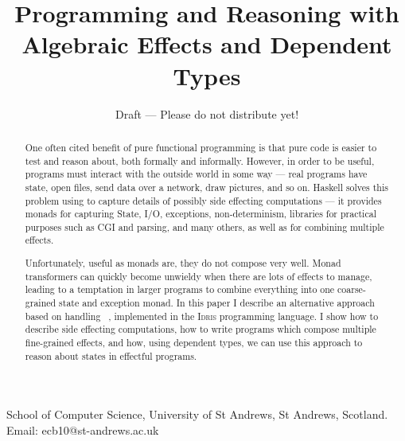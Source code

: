 \documentclass[preprint]{sigplanconf}
\newcounter{per}
\newcommand{\Idris}{\textsc{Idris}}
\begin{document}
\title{Programming and Reasoning with Algebraic Effects and Dependent Types}
\subtitle{Draft --- Please do not distribute yet!}
{School of Computer Science, 
University of St Andrews, St Andrews, Scotland.}
{Email: ecb10@st-andrews.ac.uk}

\maketitle

\begin{abstract}
One often cited benefit of pure functional programming is that pure code is
easier to test and reason about, both formally and informally. However, in
order to be useful, programs must interact with the outside world in some way
--- real programs have state, open files, send data over a network, draw
pictures, and so on. Haskell solves this problem using  to capture
details of possibly side effecting computations --- it provides monads for
capturing State, I/O, exceptions, non-determinism, libraries for practical
purposes such as CGI and parsing, and many others, as well as  for combining multiple effects.

Unfortunately, useful as monads are, they do not compose very well. Monad
transformers can quickly become unwieldy when there are lots of effects to
manage, leading to a temptation in larger programs to combine everything into
one coarse-grained state and exception monad. In this paper I describe an
alternative approach based on handling ~, implemented
in the \Idris{} programming language. I show how to describe side effecting
computations, how to write programs which compose multiple fine-grained
effects, and how, using dependent types, we can use this approach to reason
about states in effectful programs.
\end{abstract}




%

%

%












\begin{small}


\appendix
%

\end{small}
\end{document}
